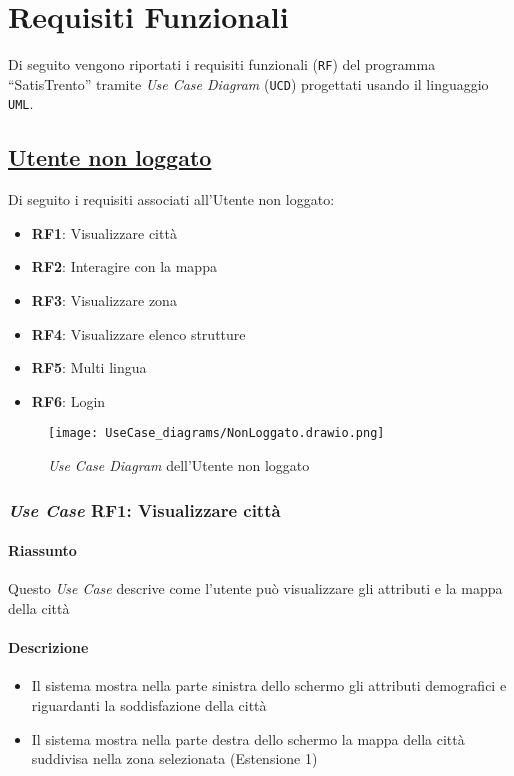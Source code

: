 \chapter{Requisiti Funzionali}
\label{ch:requisitiFunzionali}

Di seguito vengono riportati i requisiti funzionali (\texttt{RF}) del programma ``SatisTrento'' tramite \textit{Use Case Diagram} (\texttt{UCD}) progettati usando il linguaggio \texttt{UML}.

\section{\texorpdfstring{\underline{Utente non loggato}}{Utente non loggato}}
    Di seguito i requisiti associati all'Utente non loggato:
    \begin{itemize}
        \item \textbf{RF1}: Visualizzare città
        \item \textbf{RF2}: Interagire con la mappa
        \item \textbf{RF3}: Visualizzare zona
        \item \textbf{RF4}: Visualizzare elenco strutture
        \item \textbf{RF5}: Multi lingua
        \item \textbf{RF6}: Login
    \end{itemize}
    \begin{figure}[H]
        \centering
        \texttt{[image: UseCase\_diagrams/NonLoggato.drawio.png]}
        \caption{\textit{Use Case Diagram} dell'Utente non loggato}
    \end{figure}

    \subsection{\textit{Use Case} RF1: Visualizzare città}
        \subsubsection{Riassunto}
            Questo \textit{Use Case} descrive come l'utente può visualizzare gli attributi e la mappa della città
        \subsubsection{Descrizione}
            \begin{itemize}
                \item Il sistema mostra nella parte sinistra dello schermo gli attributi demografici e riguardanti la soddisfazione della città
                \item Il sistema mostra nella parte destra dello schermo la mappa della città suddivisa nella zona selezionata (Estensione 1)
            \end{itemize}
